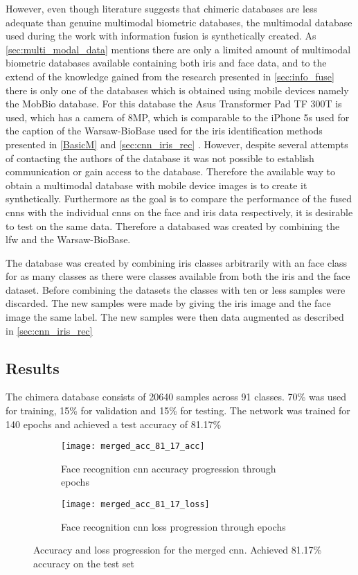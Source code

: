 However, even though literature suggests that chimeric databases are less adequate than genuine multimodal biometric databases, the multimodal database used during the work with information fusion is synthetically created. As \autoref{sec:multi_modal_data} mentions there are only a limited amount of multimodal biometric databases available containing both iris and face data, and to the extend of the knowledge gained from the research presented in \autoref{sec:info_fuse} there is only one of the databases which is obtained using mobile devices namely the MobBio database. For this database the Asus Transformer Pad TF 300T is used, which has a camera of 8MP, which is comparable to the iPhone 5s used for the caption of the Warsaw-BioBase used for the iris identification methods presented in \autoref{BasicM} and \autoref{sec:cnn_iris_rec} \citep{Sequeira2014}. However, despite several attempts of contacting the authors of the database it was not possible to establish communication or gain access to the database. Therefore the available way to obtain a multimodal database with mobile device images is to create it synthetically. Furthermore as the goal is to compare the performance of the fused \gls{cnn}s with the individual \gls{cnn}s on the face and iris data respectively, it is desirable to test on the same data. Therefore a databased was created by combining the \gls{lfw} and the Warsaw-BioBase. 

The database was created by combining iris classes arbitrarily with an face class for as many classes as there were classes available from both the iris and the face dataset. Before combining the datasets the classes with ten or less samples were discarded. The new samples were made by giving the iris image and the face image the same label. The new samples were then data augmented as described in \autoref{sec:cnn_iris_rec}

\subsection{Results}
The chimera database consists of 20640 samples across 91 classes. 70\% was used for training, 15\% for validation and 15\% for testing. The network was trained for 140 epochs and achieved a test accuracy of 81.17\%

\begin{figure}[H]
	\centering
	\begin{subfigure}{0.48\textwidth}
		\centering
		\texttt{[image: merged\_acc\_81\_17\_acc]}
		\caption{Face recognition \gls{cnn} accuracy progression through epochs}
		\label{fig:merged_acc}
	\end{subfigure}
	\begin{subfigure}{0.48\textwidth}
		\centering
		\texttt{[image: merged\_acc\_81\_17\_loss]}
		\caption{Face recognition \gls{cnn} loss progression through epochs}
		\label{fig:merged_loss}
	\end{subfigure}
	\caption{Accuracy and loss progression for the merged \gls{cnn}. Achieved 81.17\% accuracy on the test set}
	\label{fig:merged_graphs}
\end{figure}

